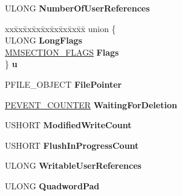 \begin{DoxyCompactItemize}
U\+L\+O\+NG {\bfseries Number\+Of\+User\+References}
\item 
\mbox{\label{struct___l_a_r_g_e___c_o_n_t_r_o_l___a_r_e_a_af35c56228171e58cebb6c29e6c93b846}} 
\begin{tabbing}
xx\=xx\=xx\=xx\=xx\=xx\=xx\=xx\=xx\=\kill
union \{\\
\>ULONG {\bfseries LongFlags}\\
\>\hyperlink{struct___m_m_s_e_c_t_i_o_n___f_l_a_g_s}{MMSECTION\_FLAGS} {\bfseries Flags}\\
\} {\bfseries u}\\

\end{tabbing}\item 
\mbox{\label{struct___l_a_r_g_e___c_o_n_t_r_o_l___a_r_e_a_a6e6855b2b1f5432400d49f7433523a21}} 
P\+F\+I\+L\+E\+\_\+\+O\+B\+J\+E\+CT {\bfseries File\+Pointer}
\item 
\mbox{\label{struct___l_a_r_g_e___c_o_n_t_r_o_l___a_r_e_a_a9b262ff4c2638d1bf96e03da156bb226}} 
\hyperlink{struct___e_v_e_n_t___c_o_u_n_t_e_r}{P\+E\+V\+E\+N\+T\+\_\+\+C\+O\+U\+N\+T\+ER} {\bfseries Waiting\+For\+Deletion}
\item 
\mbox{\label{struct___l_a_r_g_e___c_o_n_t_r_o_l___a_r_e_a_a653906483c61b455d362079b057991c4}} 
U\+S\+H\+O\+RT {\bfseries Modified\+Write\+Count}
\item 
\mbox{\label{struct___l_a_r_g_e___c_o_n_t_r_o_l___a_r_e_a_aa0617166fae49938aad3623bca8ff4fe}} 
U\+S\+H\+O\+RT {\bfseries Flush\+In\+Progress\+Count}
\item 
\mbox{\label{struct___l_a_r_g_e___c_o_n_t_r_o_l___a_r_e_a_a6f8a7a6dc82a3caf36d35d3c7ee646c1}} 
U\+L\+O\+NG {\bfseries Writable\+User\+References}
\item 
\mbox{\label{struct___l_a_r_g_e___c_o_n_t_r_o_l___a_r_e_a_a7520b9bda9da33ec5af49ba045e6ad93}} 
U\+L\+O\+NG {\bfseries Quadword\+Pad}
\item 

\end{DoxyCompactItemize}
